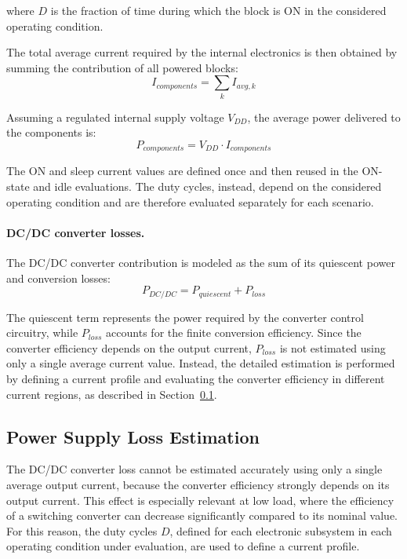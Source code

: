 where \(D\) is the fraction of time during which the block is ON in the considered operating condition.

The total average current required by the internal electronics is then obtained by summing the contribution of all powered blocks:
\begin{equation}
	I_{components} = \sum_k I_{avg,k}
\end{equation}

Assuming a regulated internal supply voltage \(V_{DD}\), the average power delivered to the components is:
\begin{equation}
	P_{components} = V_{DD} \cdot I_{components}
\end{equation}

The ON and sleep current values are defined once and then reused in the ON-state and idle evaluations. 
The duty cycles, instead, depend on the considered operating condition and are therefore evaluated separately for each scenario.

\paragraph{DC/DC converter losses.}
The DC/DC converter contribution is modeled as the sum of its quiescent power and conversion losses:
\begin{equation}
	P_{DC/DC} = P_{quiescent} + P_{loss}
\end{equation}

The quiescent term represents the power required by the converter control circuitry, while \(P_{loss}\) accounts for the finite conversion efficiency. 
Since the converter efficiency depends on the output current, \(P_{loss}\) is not estimated using only a single average current value. 
Instead, the detailed estimation is performed by defining a current profile and evaluating the converter efficiency in different current regions, as described in Section~\ref{sec:dcdc_loss_estimation}.

\subsection{Power Supply Loss Estimation}
\label{sec:dcdc_loss_estimation}

The DC/DC converter loss cannot be estimated accurately using only a single average output current, because the converter efficiency strongly depends on its output current. 
This effect is especially relevant at low load, where the efficiency of a switching converter can decrease significantly compared to its nominal value. 
For this reason, the duty cycles \(D\), defined for each electronic subsystem in each operating condition under evaluation, are used to define a current profile.

